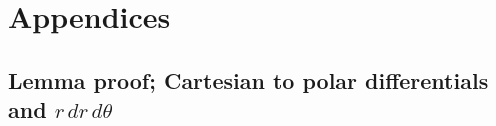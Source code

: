 \documentclass[a4paper]{article}
\begin{document}



\newpage
\printbibliography



\newpage
\appendix

\section{Appendices}


\newpage
\subsection{Lemma proof; Cartesian to polar differentials and $r\,dr\,d\theta$}
\label{app:int_change_vars_2d}
\end{document}
